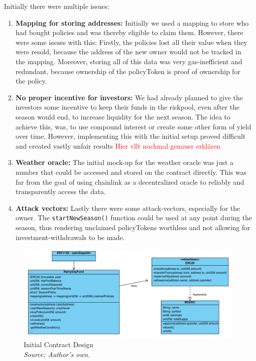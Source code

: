 \documentclass[11pt,a4paper]{article}
\begin{document}
	Initially there were multiple issues:
	\begin{enumerate}[1]
		\item \textbf{Mapping for storing addresses:} Initially we used a mapping to store who had bought policies and was thereby eligible to claim them.
			However, there were some issues with this: Firstly, the policies lost all their value when they were resold, because the address of the new owner would not be tracked in the mapping.
			Moreover, storing all of this data was very gas-inefficient and redundant, because ownership of the policyToken is proof of ownership for the policy.
		\item \textbf{No proper incentive for investors:} We had already planned to give the investors some incentive to keep their funds in the riskpool, even after the season would end, to increase liquidity for the next season.
			The idea to achieve this, was, to use compound interest or create some other form of yield over time.
			However, implementing this with the initial setup proved difficult and created vastly unfair results \textcolor{red}{Hier vllt nochmal genauer erkl\"aren}
		\item \textbf{Weather oracle:} The initial mock-up for the weather oracle was just a number that could be accessed and stored on the contract directly.
			This was far from the goal of using chainlink as a decentralized oracle to reliably and transparently access the data.
		\item \textbf{Attack vectors:} Lastly there were some attack-vectors, especially for the owner.
			The \texttt{startNewSeason()} function could be used at any point during the season, thus rendering unclaimed policyTokens worthless and not allowing for investment-withdrawals to be made.
	\end{enumerate}

	\begin{figure}[H]
		\centering
		\includegraphics[scale=0.5]{graphics/ClassDiagram_Old}
		\caption{Initial Contract Design \\ \textit{Source: Author's own.}}
		\label{fig:initial-contract-design}
	\end{figure}
\end{document}
